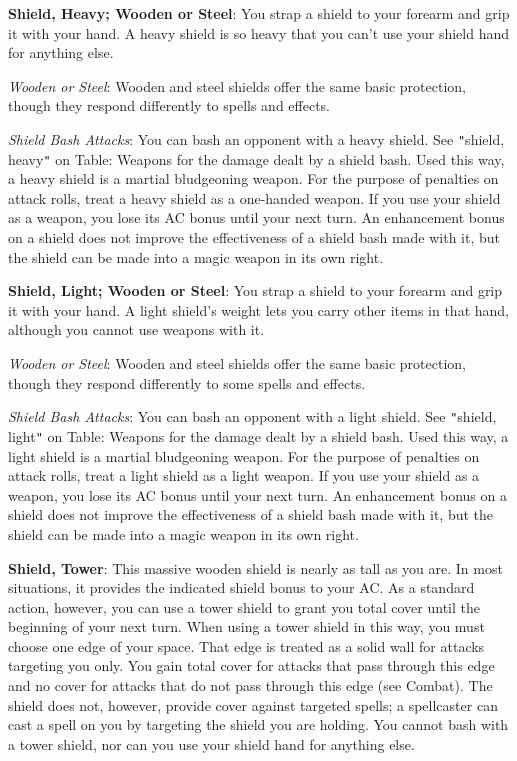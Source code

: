 \textbf{Shield, Heavy; Wooden or Steel}: You strap a shield to your forearm and grip it with your hand. A heavy shield is so heavy that you can't use your shield hand for anything else.
		
\textit{Wooden or Steel}: Wooden and steel shields offer the same basic protection, though they respond differently to spells and effects.
		
\textit{Shield Bash Attacks}: You can bash an opponent with a heavy shield. See \texttt{{}"{}}shield, heavy\texttt{{}"{}} on Table: Weapons for the damage dealt by a shield bash. Used this way, a heavy shield is a martial bludgeoning weapon. For the purpose of penalties on attack rolls, treat a heavy shield as a one-handed weapon. If you use your shield as a weapon, you lose its AC bonus until your next turn. An enhancement bonus on a shield does not improve the effectiveness of a shield bash made with it, but the shield can be made into a magic weapon in its own right.
		
\textbf{Shield, Light; Wooden or Steel}: You strap a shield to your forearm and grip it with your hand. A light shield's weight lets you carry other items in that hand, although you cannot use weapons with it.
		
\textit{Wooden or Steel}: Wooden and steel shields offer the same basic protection, though they respond differently to some spells and effects.
		
\textit{Shield Bash Attacks}: You can bash an opponent with a light shield. See \texttt{{}"{}}shield, light\texttt{{}"{}} on Table: Weapons for the damage dealt by a shield bash. Used this way, a light shield is a martial bludgeoning weapon. For the purpose of penalties on attack rolls, treat a light shield as a light weapon. If you use your shield as a weapon, you lose its AC bonus until your next turn. An enhancement bonus on a shield does not improve the effectiveness of a shield bash made with it, but the shield can be made into a magic weapon in its own right.
		
\textbf{Shield, Tower}: This massive wooden shield is nearly as tall as you are. In most situations, it provides the indicated shield bonus to your AC. As a standard action, however, you can use a tower shield to grant you total cover until the beginning of your next turn. When using a tower shield in this way, you must choose one edge of your space. That edge is treated as a solid wall for attacks targeting you only. You gain total cover for attacks that pass through this edge and no cover for attacks that do not pass through this edge (see Combat). The shield does not, however, provide cover against targeted spells; a spellcaster can cast a spell on you by targeting the shield you are holding. You cannot bash with a tower shield, nor can you use your shield hand for anything else.
		
